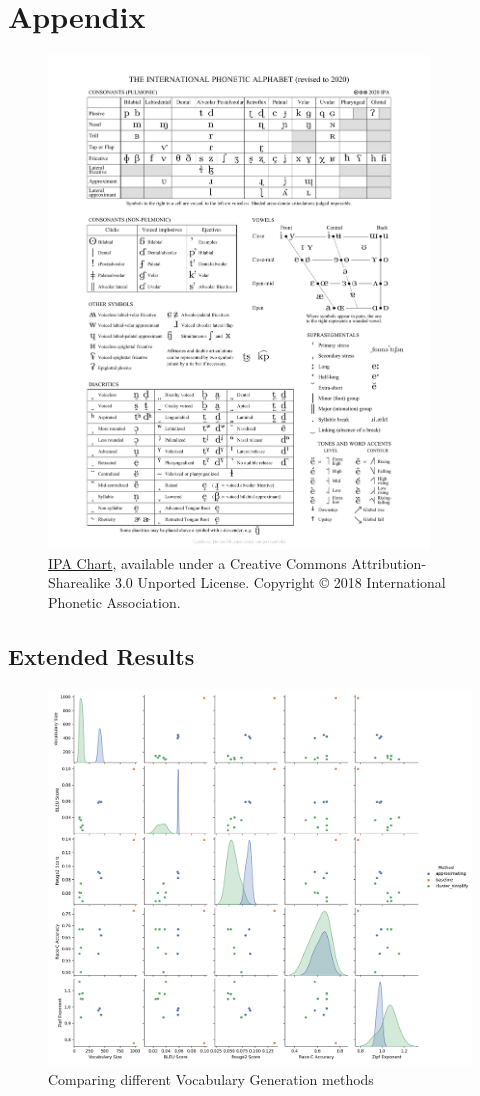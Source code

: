 \chapter{Appendix}\label{chapter:appendix}

\begin{figure}
    \centering
    \includegraphics[width=0.9\textwidth]{figures/IPA_unitipa_2020_full.pdf}
    \caption{\href{http://www.internationalphoneticassociation.org/content/ipa-chart}{IPA Chart}, available under a Creative Commons Attribution-Sharealike 3.0 Unported License. 
    Copyright © 2018 International Phonetic Association.}
    \label{fig:ipa_chart}
\end{figure}

\section{Extended Results}
\begin{figure}[H]  
    \centering
    \includegraphics[width=0.9\linewidth]{figures/results/0_pairplot_vocabulary.png}
    \caption{Comparing different Vocabulary Generation methods}
    \label{fig:compare-vocab-gen-types}
\end{figure}